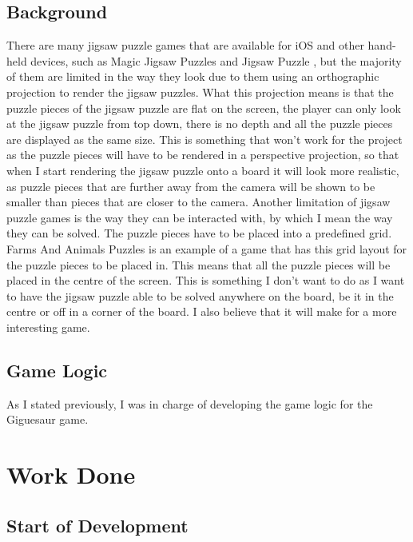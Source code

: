\documentclass{article}
\begin{document}
\subsection{Background}
There are many jigsaw puzzle games that are available for iOS and other hand-held devices, such as Magic Jigsaw Puzzles \cite{MagicJigsaw} and Jigsaw Puzzle \cite{JigsawPuzzle}, but the majority of them are limited in the way they look due to them using an orthographic projection to render the jigsaw puzzles. What this projection means is that the puzzle pieces of the jigsaw puzzle are flat on the screen, the player can only look at the jigsaw puzzle from top down, there is no depth and all the puzzle pieces are displayed as the same size. This is something that won't work for the project as the puzzle pieces will have to be rendered in a perspective projection, so that when I start rendering the jigsaw puzzle onto a board it will look more realistic, as puzzle pieces that are further away from the camera will be shown to be smaller than pieces that are closer to the camera. Another limitation of jigsaw puzzle games is the way they can be interacted with, by which I mean the way they can be solved. The puzzle pieces have to be placed into a predefined grid. Farms And Animals Puzzles \cite{FarmPuzzle} is an example of a game that has this grid layout for the puzzle pieces to be placed in. This means that all the puzzle pieces will be placed in the centre of the screen. This is something I don’t want to do as I want to have the jigsaw puzzle able to be solved anywhere on the board, be it in the centre or off in a corner of the board. I also believe that it will make for a more interesting game.

\subsection{Game Logic}
As I stated previously, I was in charge of developing the game logic for the Giguesaur game.


\section{Work Done}

\subsection{Start of Development}
\end{document}
